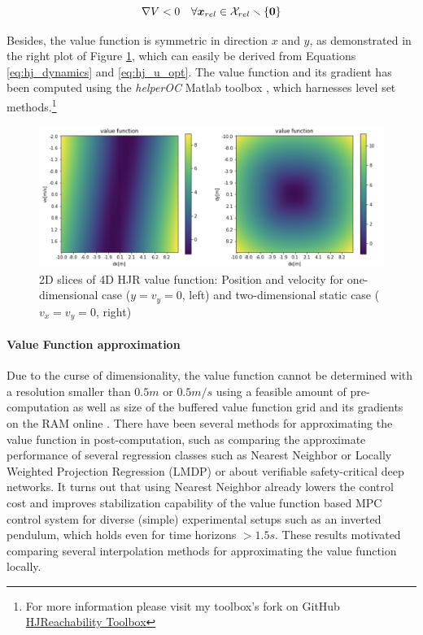 \begin{equation}
\nabla V < 0 \quad \forall \boldsymbol{x}_{rel} \in \mathcal{X}_{rel} \smallsetminus \{ \boldsymbol{0} \}
\label{eq:hj_value_negative}
\end{equation}

Besides, the value function is symmetric in direction $x$ and $y$, as demonstrated in the right plot of Figure \ref{img:hj_value_function}, which can easily be derived from Equations \ref{eq:hj_dynamics} and \ref{eq:hj_u_opt}. The value function and its gradient has been computed using the \textit{helperOC} Matlab toolbox \cite{Bansal2017}, which harnesses level set methods.\footnote{For more information please visit my toolbox's fork on GitHub \href{https://github.com/simon-schaefer/HJReachibility}{HJReachability Toolbox}}

\begin{figure}[!ht]
\begin{center}
\includegraphics[width=\imgwidth]{images/hj_value_function.png}
\caption{2D slices of 4D \ac{HJR} value function: Position and velocity for one-dimensional case ($y = v_y = 0$, left) and two-dimensional static case ($v_x = v_y = 0$, right)}
\label{img:hj_value_function}
\end{center}
\end{figure}

\paragraph{Value Function approximation}
Due to the curse of dimensionality, the value function cannot be determined with a resolution smaller than $0.5 m$ or $0.5 m/s$ using a feasible amount of pre-computation as well as size of the buffered value function grid and its gradients on the RAM online \cite{Pavone2020}. There have been several methods for approximating the value function in post-computation, such as \cite{Zhong2013} comparing the approximate performance of several regression classes such as Nearest Neighbor or Locally Weighted Projection Regression (LMDP) or \cite{Kuper2018} about verifiable safety-critical deep networks. It turns out that using Nearest Neighbor already lowers the control cost and improves stabilization capability of the value function based MPC control system for diverse (simple) experimental setups such as an inverted pendulum, which holds even for time horizons $> 1.5s$. These results motivated comparing several interpolation methods for approximating the value function locally.

